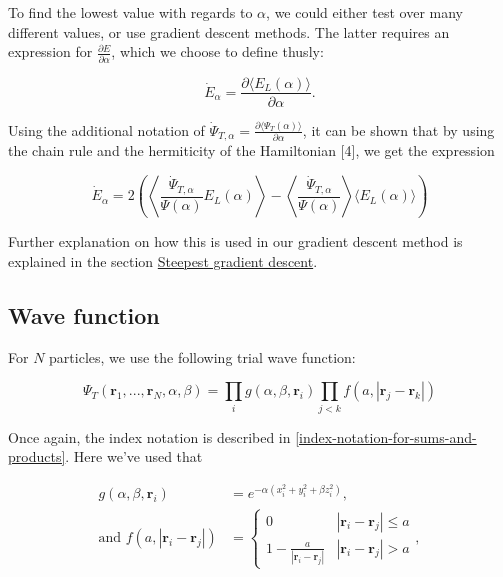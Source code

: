 \documentclass[
]{article}
\begin{document}
To find the lowest value with regards to \(\alpha\), we could either
test over many different values, or use gradient descent methods. The
latter requires an expression for
\(\frac{\partial E}{\partial \alpha}\), which we choose to define
thusly:

\[ \dot E_\alpha = \frac{\partial \langle E_L(\alpha)\rangle}{\partial \alpha} .\]

Using the additional notation of
\(\dot \Psi_{T, \alpha} = \frac{\partial \langle \Psi_T(\alpha)\rangle}{\partial \alpha}\),
it can be shown that by using the chain rule and the hermiticity of the
Hamiltonian {[}4{]}, we get the expression

\begin{equation} \dot E_\alpha = 2\left(\left\langle\frac{\dot \Psi_{T, \alpha}}{\Psi(\alpha)} E_L(\alpha)\right\rangle - \left\langle\frac{\dot \Psi_{T, \alpha}}{\Psi(\alpha)}\right\rangle \langle E_L(\alpha)\rangle\right) \label{eq:energy-deriv}\end{equation}

Further explanation on how this is used in our gradient descent method
is explained in the section
\protect\hyperlink{steepest-gradient-descent}{Steepest gradient
descent}.

\hypertarget{wave-function}{%
\subsection{Wave function}\label{wave-function}}

For \(N\) particles, we use the following trial wave function:

\begin{equation}\Psi_T(\mathbf r_1, ..., \mathbf r_N, \alpha, \beta) = \prod_i g(\alpha, \beta, \mathbf r_i) \prod_{j < k}f(a, |\mathbf r_j - \mathbf r_k|)\label{eq:trial-wavefunction}\end{equation}

Once again, the index notation is described in
\ref{index-notation-for-sums-and-products}. Here we've used that

\begin{align*}
g(\alpha,\beta,\mathbf{r}_i) &= e^{-\alpha(x_i^2+y_i^2+\beta z_i^2)}, \\
\text{and }f(a,|\mathbf r_i-\mathbf r_j|) &= \begin{cases} 0 & |\mathbf r_i-\mathbf r_j| \le a \\ 1-\frac{a}{|\mathbf r_i-\mathbf r_j|} & {|\mathbf r_i-\mathbf r_j|} > a \end{cases},
\end{align*}
\end{document}
